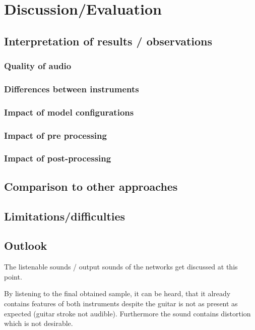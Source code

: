 \chapter{Discussion/Evaluation}
\label{cha:Discussion}

\section{Interpretation of results / observations}

\subsection{Quality of audio}

\subsection{Differences between instruments}

\subsection{Impact of model configurations}

\subsection{Impact of pre processing}

\subsection{Impact of post-processing}

\section{Comparison to other approaches}

\section{Limitations/difficulties}

\section{Outlook}

The listenable sounds / output sounds of the networks get discussed at this point.

By listening to the final obtained sample, it can be heard, that it already contains features of both instruments despite the guitar is not as present as expected (guitar stroke not audible). Furthermore the sound contains distortion which is not desirable.